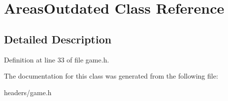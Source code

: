 \hypertarget{classAreasOutdated}{\section{Areas\+Outdated Class Reference}
\label{classAreasOutdated}
}


\subsection{Detailed Description}


Definition at line 33 of file game.\+h.



The documentation for this class was generated from the following file\+:\begin{DoxyCompactItemize}
\item 
headers/game.\+h\end{DoxyCompactItemize}

